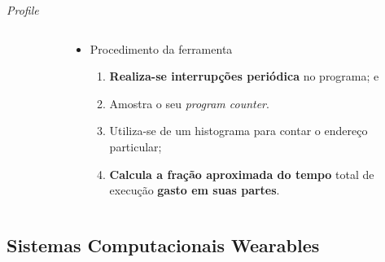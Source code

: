\begin{frame}{\textit{Profile}}
\begin{columns}
\begin{column}{0.5\textwidth}
\begin{figure}[h]
               \end{figure}
            \end{column}
            \begin{column}{0.5\textwidth}
               \vspace{-1cm}
               \begin{itemize}
                  \item Procedimento da ferramenta
                  \begin{enumerate}
                     \setlength{\itemsep}{0.8em}
                     \item \textbf{Realiza-se interrupções periódica} no programa; e
                     \item Amostra o seu \textit{program counter}.
                     
                     \item Utiliza-se de um histograma para contar o endereço particular;
                     
                     \item \textbf{Calcula a fração aproximada do tempo} total de execução \textbf{gasto em suas partes}. 
                  \end{enumerate}
               \end{itemize}
            
            \end{column}
         \end{columns}
         
      \end{frame}


   \subsection{Sistemas Computacionais Wearables}

